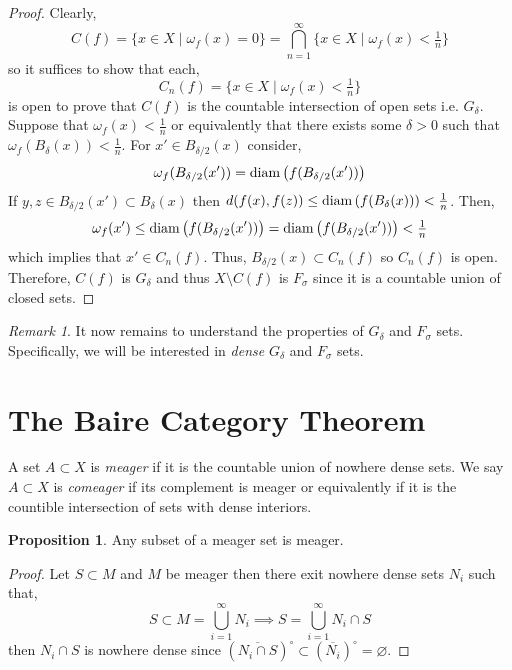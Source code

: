 \documentclass{article}
\newcommand{\ball}[2]{B_{#1} \! \left(#2 \right)}
\newenvironment{definition}[1][Definition:]{\begin{trivlist}
\item[\hskip \labelsep {\bfseries #1}]}{\end{trivlist}}
\theoremstyle{theorem}
\theoremstyle{definition}
\theoremstyle{definition}
\newtheorem*{proposition}{Proposition}
\theoremstyle{remark}
\theoremstyle{definition}
\theoremstyle{remark}
\newtheorem{remark}{Remark}[subsection]
\begin{document}
\begin{proof}
Clearly,
\[ C(f) = \{ x \in X \mid \omega_f(x) = 0\} = \bigcap_{n = 1}^{\infty} \{ x \in X \mid \omega_f(x) < \tfrac{1}{n} \} \]
so it suffices to show that each,
\[ C_n(f) = \{ x \in X \mid \omega_f(x) < \tfrac{1}{n} \} \]
is open to prove that $C(f)$ is the countable intersection of open sets i.e. $G_{\delta}$. Suppose that $\omega_f(x) < \frac{1}{n}$ or equivalently that there exists some $\delta > 0$ such that $\omega_f(\ball{\delta}{x}) < \frac{1}{n}$. For $x' \in \ball{\delta/2}{x}$ consider,
\[ \omega_f(\ball{\delta/2}{x'}) = \diam{f(\ball{\delta/2}{x'})} \]
If $y,z \in \ball{\delta/2}{x'} \subset \ball{\delta}{x}$ then $d(f(x), f(z)) \le \diam{f(\ball{\delta}{x})} < \frac{1}{n}$. Then, 
\[ \omega_f(x') \le \diam{f(\ball{\delta/2}{x'})}  = \diam{f(\ball{\delta/2}{x'})} < \tfrac{1}{n} \]
which implies that $x' \in C_n(f)$. Thus, $\ball{\delta/2}{x} \subset C_n(f)$ so $C_n(f)$ is open. Therefore, $C(f)$ is $G_{\delta}$ and thus $X \setminus C(f)$ is $F_{\sigma}$ since it is a countable union of closed sets. 
\end{proof}

\begin{remark}
It now remains to understand the properties of $G_{\delta}$ and $F_{\sigma}$ sets. Specifically, we will be interested in \textit{dense} $G_{\delta}$ and $F_{\sigma}$ sets. 
\end{remark}

\section{The Baire Category Theorem}

\begin{definition}
A set $A \subset X$ is \textit{meager} if it is the countable union of nowhere dense sets. We say $A \subset X$ is \textit{comeager} if its complement is meager or equivalently if it is the countible intersection of sets with dense interiors.  
\end{definition}

\begin{proposition}
Any subset of a meager set is meager.
\end{proposition}

\begin{proof}
Let $S \subset M$ and $M$ be meager then there exit nowhere dense sets $N_i$ such that,
\[ S \subset M = \bigcup_{i = 1}^{\infty} N_i \implies S = \bigcup_{i = 1}^{\infty} N_i \cap S \]
then $N_i \cap S$ is nowhere dense since $(\overline{N_i \cap S})^\circ \subset (\overline{N_i})^\circ = \varnothing$.
\end{proof}
\end{document}
